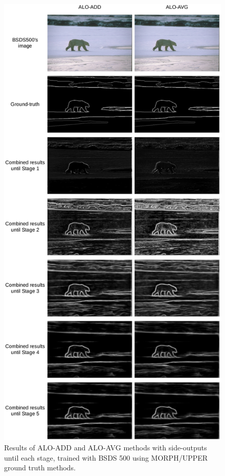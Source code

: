 \begin{figure}%
  \centering
  \includegraphics[width=0.9\columnwidth]{../imagens/ilustracoes/cap6_bsds_stage_results.png}
  \caption{Results of ALO-ADD and ALO-AVG methods with side-outputs until each stage, trained with BSDS 500 using MORPH/UPPER ground truth methods.}
  \label{fig:bsds_stage_results}
\end{figure}


